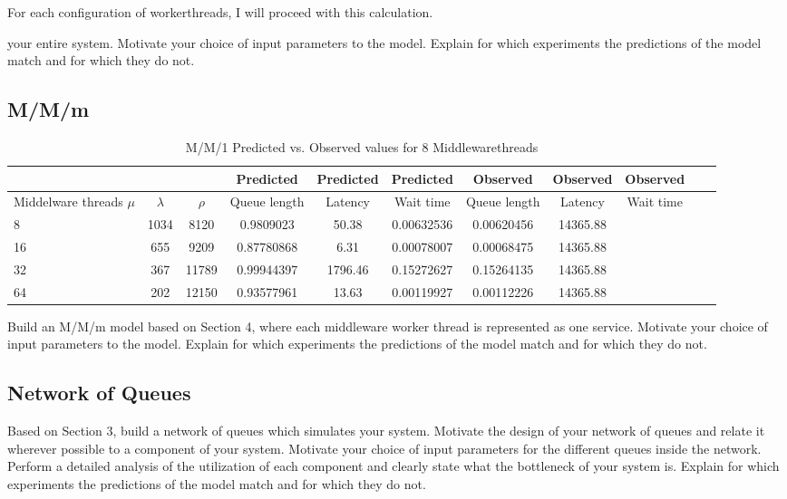 \documentclass[11pt,a4paper]{article}
\begin{document}
For each configuration of workerthreads, I will proceed with this calculation.


your entire system. Motivate your choice of input parameters to the model. Explain for which experiments the predictions of the model match and for which they do not.

\subsection{M/M/m}


\begin{table}[H]
	\caption{M/M/1 Predicted vs. Observed values for 8 Middlewarethreads}
	\scriptsize{
		\begin{tabular}{|l|c|c|c|c|c|c|c|c|c|c|}
					\hline & & & Predicted & Predicted & Predicted & Observed & Observed & Observed &\\ 
			\hline Middelware threads $\mu$ & $\lambda$ & $\rho$ & Queue length & Latency & Wait time & Queue length & Latency & Wait time \\ 
			\hline 8 & 1034 & 8120 & 0.9809023 & 50.38 & 0.00632536 & 0.00620456 &  14365.88 \\ 
			\hline 16 & 655 & 9209 & 0.87780868 & 6.31 & 0.00078007 & 0.00068475 &  14365.88 \\ 
			\hline 32 & 367 & 11789 & 0.99944397 & 1796.46 & 0.15272627 & 0.15264135 &  14365.88 \\ 
			\hline 64 & 202 & 12150 & 0.93577961 & 13.63 & 0.00119927 & 0.00112226 &  14365.88 \\ 
			\hline
		\end{tabular}
	} 
\end{table}

Build an M/M/m model based on Section 4, where each middleware worker thread is represented as one service.  Motivate your choice of input parameters to the model. Explain for which experiments the predictions of the model match and for which they do not.

\subsection{Network of Queues}

Based on Section 3, build a network of queues which simulates your system. Motivate the design of your network of queues and relate it wherever possible to a component of your system. Motivate your choice of input parameters for the different queues inside the network. Perform a detailed analysis of the utilization of each component and clearly state what the bottleneck of your system is. Explain for which experiments the predictions of the model match and for which they do not.
\end{document}
